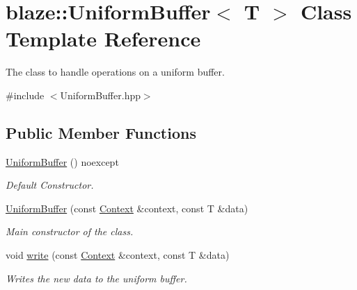 \hypertarget{classblaze_1_1UniformBuffer}{}\section{blaze\+:\+:Uniform\+Buffer$<$ T $>$ Class Template Reference}
\label{classblaze_1_1UniformBuffer}


The class to handle operations on a uniform buffer.  




{\ttfamily \#include $<$Uniform\+Buffer.\+hpp$>$}

\subsection*{Public Member Functions}
\begin{DoxyCompactItemize}
\item 
\mbox{\label{classblaze_1_1UniformBuffer_ace7278a809973ad09965dc372ee9a0d6}} 
\hyperlink{classblaze_1_1UniformBuffer_ace7278a809973ad09965dc372ee9a0d6}{Uniform\+Buffer} () noexcept
\begin{DoxyCompactList}\small\item\em Default Constructor. \end{DoxyCompactList}\item 
\hyperlink{classblaze_1_1UniformBuffer_a96dde441b0d31fb0949a864c139c072c}{Uniform\+Buffer} (const \hyperlink{classblaze_1_1Context}{Context} \&context, const T \&data)
\begin{DoxyCompactList}\small\item\em Main constructor of the class. \end{DoxyCompactList}\item 
void \hyperlink{classblaze_1_1UniformBuffer_a36699598a9fae6985328009a02af8de5}{write} (const \hyperlink{classblaze_1_1Context}{Context} \&context, const T \&data)
\begin{DoxyCompactList}\small\item\em Writes the new data to the uniform buffer. \end{DoxyCompactList}\end{DoxyCompactItemize}
